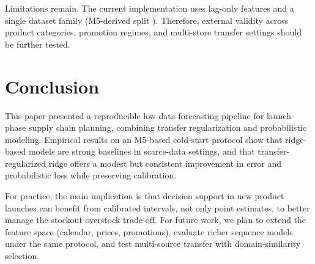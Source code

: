 \documentclass[3p,times,procedia]{elsarticle}
\begin{document}
Limitations remain. The current implementation uses lag-only features and a single dataset family (M5-derived split \cite{M5ForecastingUncertainty2020}). Therefore, external validity across product categories, promotion regimes, and multi-store transfer settings should be further tested.

\section{Conclusion}
This paper presented a reproducible low-data forecasting pipeline for launch-phase supply chain planning, combining transfer regularization and probabilistic modeling. Empirical results on an M5-based cold-start protocol \cite{M5ForecastingUncertainty2020} show that ridge-based models are strong baselines in scarce-data settings, and that transfer-regularized ridge offers a modest but consistent improvement in error and probabilistic loss while preserving calibration.

For practice, the main implication is that decision support in new product launches can benefit from calibrated intervals, not only point estimates, to better manage the stockout-overstock trade-off. For future work, we plan to extend the feature space (calendar, prices, promotions), evaluate richer sequence models under the same protocol, and test multi-source transfer with domain-similarity selection.




\end{document}
